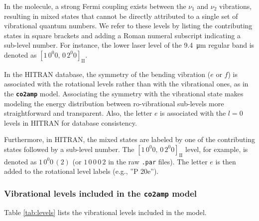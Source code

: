 \documentclass{report}
\begin{document}
In the  molecule, a strong Fermi coupling exists between the $\nu_1$ and $\nu_2$ vibrations, resulting in mixed states that cannot be directly attributed to a single set of vibrational quantum numbers. We refer to these levels by listing the contributing states in square brackets and adding a Roman numeral subscript indicating a sub-level number. For instance, the lower laser level of the \SI{9.4}{\micro\meter} regular band is denoted as $[1\,0^{0}0,\,0\,2^{0}0]_{\mathrm{II}}$.

In the HITRAN database, the symmetry of the bending vibration ($e$ or $f$) is associated with the rotational levels rather than with the vibrational ones, as in the \textbf{\texttt{co2amp}} model. Associating the symmetry with the vibrational state makes modeling the energy distribution between ro-vibrational sub-levels more straightforward and transparent. Also, the letter $e$ is associated with the $l = 0$ levels in HITRAN for database consistency.

Furthermore, in HITRAN, the mixed states are labeled by one of the contributing states followed by a sub-level number. The $[1\,0^{0}0,\,0\,2^{0}0]_{\mathrm{II}}$ level, for example, is denoted as $1\,0^{0}0\,(2)$ (or $1\,0\,0\,0\,2$ in the raw \texttt{.par} files). The letter $e$ is then added to the rotational level labels (e.g., ''P 20e'').




\subsubsection{Vibrational levels included in the \textbf{\texttt{co2amp}} model}

Table \ref{tab:levels} lists the vibrational levels included in the model.
\end{document}
